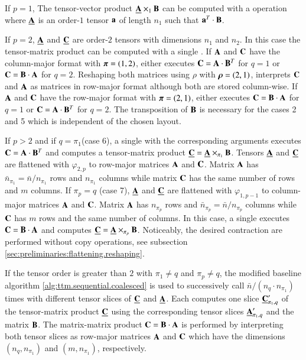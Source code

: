 If $p=1$, The tensor-vector product $\underline{\mathbf{A}} \times_1 \mathbf{B}$ can be computed with a  operation where $\underline{\mathbf{A}}$ is an order-$1$ tensor $\mathbf{a}$ of length $n_1$ such that $\mathbf{a}^T \cdot \mathbf{B}$.

If $p=2$, $\underline{\mathbf{A}}$ and $\underline{\mathbf{C}}$ are order-$2$ tensors with dimensions $n_1$ and $n_2$.
In this case the tensor-matrix product can be computed with a single .
If $\mathbf{A}$ and $\mathbf{C}$ have the column-major format with $\boldsymbol{\pi}=(1,2)$,  either executes $\mathbf{C} = \mathbf{A} \cdot \mathbf{B}^T$ for $q =1$ or $\mathbf{C} = \mathbf{B} \cdot \mathbf{A}$ for $q=2$.
Reshaping both matrices using $\rho$ with $\boldsymbol{\rho} = (2,1)$,  interprets $\mathbf{C}$ and $\mathbf{A}$ as matrices in row-major format although both are stored column-wise.
If $\mathbf{A}$ and $\mathbf{C}$ have the row-major format with $\boldsymbol{\pi}=(2,1)$,  either executes $\mathbf{C} = \mathbf{B} \cdot \mathbf{A}$ for $q =1$ or $\mathbf{C} = \mathbf{A} \cdot \mathbf{B}^T$ for $q=2$. 
The transposition of $\mathbf{B}$ is necessary for the cases 2 and 5 which is independent of the chosen layout.

If $p>2$ and if $q=\pi_1$(case 6), a single  with the corresponding arguments executes $\mathbf{C} = \mathbf{A} \cdot \mathbf{B}^T$ and computes a tensor-matrix product $\underline{\mathbf{C}} = \underline{\mathbf{A}} \times_{\pi_1} \mathbf{B}$.
Tensors $\underline{\mathbf{A}}$ and $\underline{\mathbf{C}}$ are flattened with $\varphi_{2,p}$ to row-major matrices $\mathbf{A}$ and $\mathbf{C}$.
Matrix $\mathbf{A}$ has $\bar{n}_{\pi_1} = \bar{n} / n_{\pi_1}$ rows and $n_{\pi_1}$ columns while matrix $\mathbf{C}$ has the same number of rows and $m$ columns.
If $\pi_p=q$ (case 7), $\underline{\mathbf{A}}$ and $\underline{\mathbf{C}}$ are flattened with $\varphi_{1,p-1}$ to column-major matrices $\mathbf{A}$ and $\mathbf{C}$.
Matrix $\mathbf{A}$ has $n_{\pi_p}$ rows and $\bar{n}_{\pi_p} =  \bar{n} / n_{\pi_p}$ columns while $\mathbf{C}$ has $m$ rows and the same number of columns.
In this case, a single  executes $\mathbf{C} = \mathbf{B} \cdot \mathbf{A}$ and computes $\underline{\mathbf{C}} = \underline{\mathbf{A}} \times_{\pi_p} \mathbf{B}$.
Noticeably, the desired contraction are performed without copy operations, see subsection \ref{sec:preliminaries:flattening.reshaping}.

If the tensor order is greater than $2$ with $\pi_1\neq q$ and $\pi_p \neq q$, the modified baseline algorithm \ref{alg:ttm.sequential.coalesced} is used to successively call $\bar{n} / (n_q \cdot n_{\pi_1})$ times  with different tensor slices of $\underline{\mathbf{C}}$ and $\underline{\mathbf{A}}$.
Each  computes one slice $\underline{\mathbf{C}}_{\pi_1,q}'$ of the tensor-matrix product $\underline{\mathbf{C}}$ using the corresponding tensor slices $\underline{\mathbf{A}}_{\pi_1,q}'$ and the matrix $\mathbf{B}$.
The matrix-matrix product $\mathbf{C} = \mathbf{B} \cdot \mathbf{A}$ is performed by interpreting both tensor slices as row-major matrices $\mathbf{A}$ and $\mathbf{C}$ which have the dimensions $(n_q,n_{\pi_1})$ and $(m,n_{\pi_1})$, respectively.

